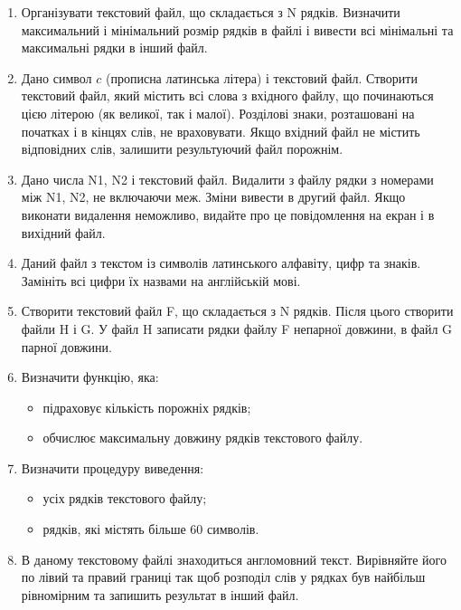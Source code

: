 \documentclass[a5paper,titlepage,openany,twoside,draft]{book_unv}%
\begin{document}
\begin{enumerate}
\def\labelenumi{\arabic{enumi})}
\setcounter{enumi}{16}

\item
  Організувати текстовий файл, що складається з N рядків. Визначити
  максимальний і мінімальний розмір рядків в файлі і вивести всі мінімальні та
максимальні рядки в інший файл.

\item
  Дано символ $c$ (прописна латинська літера) і текстовий файл. Створити
  текстовий файл, який містить всі слова з вхідного файлу, що
  починаються цією літерою (як великої, так і малої). Розділові знаки,
  розташовані на початках і в кінцях слів, не враховувати. Якщо вхідний
  файл не містить відповідних слів, залишити результуючий файл порожнім.

\item
  Дано числа N1, N2 і текстовий файл. Видалити з файлу рядки з номерами
  між N1, N2, не включаючи меж. Зміни вивести в другий файл. Якщо
  виконати видалення неможливо, видайте про це повідомлення на екран і в
  вихідний файл.
\item
  Даний файл з текстом із символів латинського алфавіту, цифр та знаків.
  Замініть всі цифри їх назвами на англійській мові.
\item
  Створити текстовий файл F, що складається з N рядків. Після цього
  створити файли H і G. У файл H записати рядки файлу F непарної
  довжини, в файл G парної довжини.

\item
 Визначити функцію, яка:
\begin{itemize}
\item підраховує кількість порожніх рядків;
\item обчислює максимальну довжину рядків текстового файлу.
\end{itemize}

\item Визначити процедуру виведення:
\begin{itemize}
\item усіх рядків текстового файлу;
\item рядків, які містять більше 60 символів.
\end{itemize}

\item
В даному текстовому файлі знаходиться англомовний текст. Вирівняйте
його по лівий та правий границі так щоб розподіл слів у рядках був
найбільш рівномірним та запишить результат в інший файл.


\end{enumerate}
\end{document}
